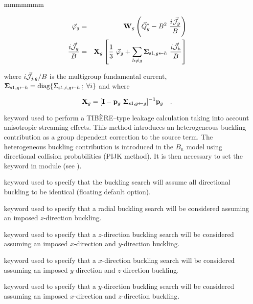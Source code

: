 \begin{ListeDeDescription}{mmmmmmm}
\vskip -0.3cm

\begin{eqnarray}
\vec\varphi_g&=& {\bf W}_g \left(\vec Q^{*}_g - B^2 \ {i\vec{\cal J}_g\over B}\right)
\label{eq:eq5.37flux} \\
{i\vec{\cal J}_g\over B} &=& {\bf X}_g \left[{1 \over 3}
\ \vec\varphi_g + \sum_{h\not= g} {\bf \Sigma}_{{\rm s1},g \gets h} \
{i\vec{\cal J}_h\over B} \right]
\label{eq:eq5.37cour}
\end{eqnarray}

\noindent where $i\vec{\cal J}_{j,g}/B$ is the multigroup fundamental current, ${\bf \Sigma}_{{\rm s1},g \gets h}={\rm diag}\{ \Sigma_{{\rm s1},i,g \gets h}\> ;\> \forall i \}$ and where

\begin{equation}
{\bf X}_g=[{\bf I}-{\bf p}_g \ {\bf\Sigma}_{{\rm s}1,g\gets g}]^{-1} {\bf p}_g \ \ \ .
\label{eq:eq5.37ter}
\end{equation}

\item[\moc{HETE}] keyword used to perform a TIB\`ERE--type leakage
calculation taking into account anisotropic streaming effects. This method
introduces an heterogeneous buckling contribution as a group dependent correction
to the source term.\cite{PIJK0,PIJK} The heterogeneous buckling contribution is
introduced in the $B_n$ model using directional collision probabilities (PIJK method).
It is then necessary to set the keyword
 in module  (see ).

\item[\moc{G}] keyword used to specify that the buckling search will assume
all directional buckling to be identical (floating default option).

\item[\moc{R}] keyword used to specify that a radial buckling search will be
considered assuming an imposed $z$-direction buckling.

\item[\moc{Z}] keyword used to specify that a $z$-direction buckling search
will be considered  assuming an imposed $x$-direction and $y$-direction
buckling.

\item[\moc{X}] keyword used to specify that a $x$-direction buckling search
will be considered  assuming an imposed $y$-direction and $z$-direction
buckling.

\item[\moc{Y}] keyword used to specify that a $y$-direction buckling search
will be considered  assuming an imposed $x$-direction and $z$-direction
buckling.


\end{ListeDeDescription}
